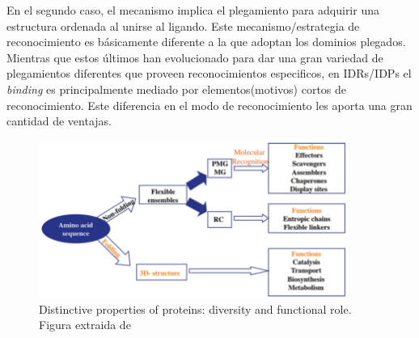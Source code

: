 En el segundo caso, el mecanismo implica el plegamiento para adquirir una estructura ordenada al unirse al ligando.
Este mecanismo/estrategia de reconocimiento es básicamente diferente a la que adoptan los dominios plegados.
Mientras que estos últimos han evolucionado para dar una gran variedad de plegamientos diferentes que proveen reconocimientos especificos, 
en IDRs/IDPs el \textit{binding} es principalmente mediado por elementos(motivos) cortos de reconocimiento\cite{neduva2005systematic,fuxreiter2007local}.
Este diferencia en el modo de reconocimiento les aporta una gran cantidad de ventajas\cite{gunasekaran2003extended,dyson2005intrinsically}.%



\begin{figure}[h!,centered]
\centering
\includegraphics[width=0.9\textwidth]{img/proteinFunctionMechanisms.png} 
\caption{Distinctive properties of proteins: diversity and functional role. Figura extraida de \cite{habchi2014introducing} }
\label{proteinMechanisms}
\end{figure}





